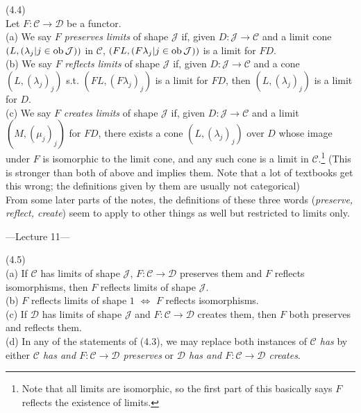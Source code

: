 \documentclass[a4paper]{article}
\begin{document}
\begin{defi} (4.4)\\
    Let $F: \mathcal{C} \to \mathcal{D}$ be a functor.\\
    (a) We say $F$ \emph{preserves limits} of shape $\mathcal{J}$ if, given $D:\mathcal{J} \to \mathcal{C}$ and a limit cone $(L,(\lambda_j|j \in \operatorname{ob}\mathcal{J}))$ in $\mathcal{C}$, $(FL, (F\lambda_j | j \in \operatorname{ob} \mathcal{J}))$ is a limit for $FD$.\\
    (b) We say $F$ \emph{reflects limits} of shape $\mathcal{J}$ if, given $D:\mathcal{J} \to \mathcal{C}$ and a cone $(L,(\lambda_j)_j)$ s.t. $(FL,(F\lambda_j)_j)$ is a limit for $FD$, then $(L,(\lambda_j)_j)$ is a limit for $D$.\\
    (c) We say $F$ \emph{creates limits} of shape $\mathcal{J}$ if, given $D : \mathcal{J} \to \mathcal{C}$ and a limit $(M,(\mu_j)_j)$ for $FD$, there exists a cone $(L,(\lambda_j)_j)$ over $D$ whose image under $F$ is isomorphic to the limit cone, and any such cone is a limit in $\mathcal{C}$.\footnote{Note that all limits are isomorphic, so the first part of this basically says $F$ reflects the existence of limits.} (This is stronger than both of above and implies them. Note that a lot of textbooks get this wrong; the definitions given by them are usually not categorical)\\
    From some later parts of the notes, the definitions of these three words (\emph{preserve, reflect, create}) seem to apply to other things as well but restricted to limits only.
\end{defi}

---Lecture 11---

\begin{rem} (4.5)\\
    (a) If $\mathcal{C}$ has limits of shape $\mathcal{J}$, $F: \mathcal{C} \to \mathcal{D}$ preserves them and $F$ reflects isomorphisms, then $F$ reflects limits of shape $\mathcal{J}$.\\
    (b) $F$ reflects limits of shape $1$ $\iff$ $F$ reflects isomorphisms.\\
    (c) If $\mathcal{D}$ has limits of shape $\mathcal{J}$ and $F:\mathcal{C} \to \mathcal{D}$ creates them, then $F$ both preserves and reflects them.\\
    (d) In any of the statements of (4.3), we may replace both instances of \emph{$\mathcal{C}$ has} by either \emph{$\mathcal{C}$ has and $F:\mathcal{C} \to \mathcal{D}$ preserves} or \emph{$\mathcal{D}$ has and $F:\mathcal{C} \to \mathcal{D}$ creates}.
\end{rem}
\end{document}
